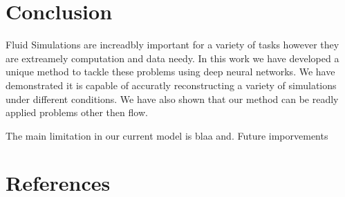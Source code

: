 \documentclass{article}
\begin{document}
\section{Conclusion}

Fluid Simulations are increadbly important for a variety of tasks however they are extreamely computation and data needy. In this work we have developed a unique method to tackle these problems using deep neural networks. We have demonstrated it is capable of accuratly reconstructing a variety of simulations under different conditions. We have also shown that our method can be readly applied problems other then flow.

The main limitation in our current model is blaa and. Future imporvements 

\section*{References}



\end{document}

